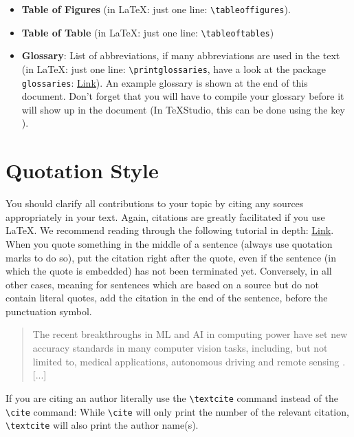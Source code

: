 \begin{itemize}
	\item \textbf{Table of Figures} (in \LaTeX: just one line: \lstinline|\tableoffigures|).
	\item \textbf{Table of Table} (in \LaTeX: just one line: \lstinline|\tableoftables|)
	\item \textbf{Glossary}: List of abbreviations, if many abbreviations are used in the text  (in \LaTeX: just one line: \lstinline|\printglossaries|, have a look at the package \lstinline|glossaries|: \href{https://www.overleaf.com/learn/latex/Glossaries}{Link}). An example glossary is shown at the end of this document. Don't forget that you will have to compile your glossary before it will show up in the document (In TeXStudio, this can be done using the key ).

\end{itemize}


\section{Quotation Style}
You should clarify all contributions to your topic by citing any sources appropriately in your text. Again, citations are greatly facilitated if you use \LaTeX. We recommend reading through the following tutorial in depth: \href{https://de.overleaf.com/learn/latex/Bibliography_management_with_biblatex}{Link}. When you quote something in the middle of a sentence (always use quotation marks to do so), put the citation right after the quote, even if the sentence (in which the quote is embedded) has not been terminated yet. Conversely, in all other cases, meaning for sentences which are based on a source but do not contain literal quotes, add the citation in the end of the sentence, before the punctuation symbol.

\begin{tcolorbox}[title=Example]
	\begin{quotation}
		The recent breakthroughs in \gls{ML} and \gls{AI} in computing power have set new accuracy standards in many computer vision tasks, including, but not limited to, medical applications, autonomous driving and remote sensing \cite{Volpi2017DenseSL, kampffmeyer, Zhu2017DeepLI, Shelhamer2015FullyCN}. [...]
	\end{quotation}

\end{tcolorbox}

If you are citing an author literally use the \lstinline|\textcite| command instead of the \lstinline|\cite| command: While \lstinline|\cite| will only print the number of the relevant citation, \lstinline|\textcite| will also print the author name(s).

